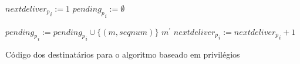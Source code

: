 \begin{algorithm}
\DontPrintSemicolon
{}

${{nextdeliver}_p}_{i} := 1$\;
${{pending}_p}_{i} := \emptyset$\;

 {
  ${{pending}_p}_{i} := {{pending}_p}_{i} \cup \{(m, seqnum)\}$\;
   {
     ${m}^{\prime}$\;
    ${{nextdeliver}_p}_{i} := {{nextdeliver}_p}_{i} + 1$\;
  }
}
\caption{Código dos destinatários para o algoritmo baseado em privilégios \cite{journals/csur/DefagoSU04}}
\label{algo:priviledge-based-simple-destinations}
\end{algorithm}
